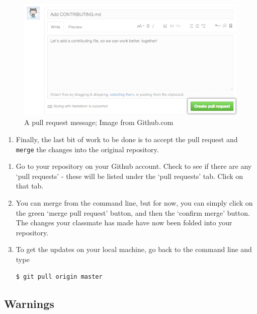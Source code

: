 \documentclass[english,]{book}
\providecommand{\tightlist}{%
  \setlength{\itemsep}{0pt}\setlength{\parskip}{0pt}}
\begin{document}
\begin{figure}[htbp]
\centering
\includegraphics{images/pullrequest-send.png}
\caption{A pull request message; Image from Github.com}
\end{figure}

\begin{enumerate}
\def\labelenumi{\arabic{enumi}.}
\setcounter{enumi}{7}
\tightlist
\item
  Finally, the last bit of work to be done is to accept the pull request
  and \texttt{merge} the changes into the original repository.
\end{enumerate}

\begin{enumerate}
\def\labelenumi{\alph{enumi}.}
\item
  Go to your repository on your Github account. Check to see if there
  are any `pull requests' - these will be listed under the `pull
  requests' tab. Click on that tab.
\item
  You can merge from the command line, but for now, you can simply click
  on the green `merge pull request' button, and then the `confirm merge'
  button. The changes your classmate has made have now been folded into
  your repository.
\item
  To get the updates on your local machine, go back to the command line
  and type

\begin{verbatim}
$ git pull origin master
\end{verbatim}
\end{enumerate}

\subsection{Warnings}\label{warnings}
\end{document}
